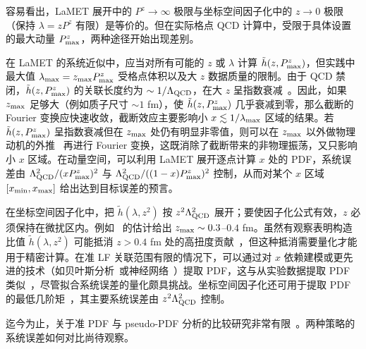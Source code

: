 容易看出，LaMET 展开中的 $P^z\to\infty$ 极限与坐标空间因子化中的 $z\to 0$ 极限（保持 $\lambda=zP^z$ 有限）是等价的。但在实际格点 QCD 计算中，受限于具体设置的最大动量 $P^z_{\rm max}$，两种途径开始出现差别。

在 LaMET 的系统近似中，应当对所有可能的 $z$ 或 $\lambda$ 计算 $\tilde h (z, P^z_{\rm max})$，但实践中最大值 $\lambda_{\rm max} = z_{\rm max}P^z_{\rm max}$ 受格点体积以及大 $z$ 数据质量的限制。由于 QCD 禁闭，$\tilde h (z, P^z_{\rm max})$ 的关联长度约为 $\sim 1/\Lambda_{\rm QCD}$，在大 $z$ 呈指数衰减~\cite{Ji:2020brr}。因此，如果 $z_{\rm max}$ 足够大（例如质子尺寸 $\sim1$ fm），使 $\tilde h (z, P^z_{\rm max})$ 几乎衰减到零，那么截断的 Fourier 变换应快速收敛，截断效应主要影响小 $x \lesssim 1/\lambda_{\rm max}$ 区域的结果。若 $\tilde h (z, P^z_{\rm max})$ 呈指数衰减但在 $z_{\rm max}$ 处仍有明显非零值，则可以在 $z_{\rm max}$ 以外做物理动机的外推~\cite{Ji:2020brr} 再进行 Fourier 变换，这既消除了截断带来的非物理振荡，又只影响小 $x$ 区域。在动量空间，可以利用 LaMET 展开逐点计算 $x$ 处的 PDF，系统误差由 $\Lambda_{\rm QCD}^2/(xP^z_{\rm max})^2$ 与 $\Lambda_{\rm QCD}^2/((1-x)P^z_{\rm max})^2$ 控制，从而对某个 $x$ 区域 $[x_{\rm min}, x_{\rm max}]$ 给出达到目标误差的预言。

在坐标空间因子化中，把 $\tilde h(\lambda, z^2)$ 按 $z^2\Lambda^2_{\rm QCD}$ 展开；要使因子化公式有效，$z$ 必须保持在微扰区内。例如~\cite{Ji:2020brr} 的估计给出 $z_{\rm max}\sim 0.3$--$0.4$ fm。虽然有观察表明构造比值 $\tilde h (\lambda, z^2)$ 可能抵消 $z>0.4$ fm 处的高扭度贡献~\cite{Orginos:2017kos}，但这种抵消需要量化才能用于精密计算。在准 LF 关联范围有限的情况下，可以通过对 $x$ 依赖建模或更先进的技术（如贝叶斯分析~\cite{Bringewatt:2020ixn}或神经网络~\cite{Karpie:2019eiq,Cichy:2019ebf,DelDebbio:2020rgv}）提取 PDF，这与从实验数据提取 PDF 类似~\cite{Ma:2017pxb}，尽管拟合系统误差的量化颇具挑战。坐标空间因子化还可用于提取 PDF 的最低几阶矩~\cite{Karpie:2018zaz,Shugert:2020tgq,Joo:2020spy,Gao:2020ito}，其主要系统误差由 $z^2\Lambda_{\rm QCD}^2$ 控制。

迄今为止，关于准 PDF 与 pseudo-PDF 分析的比较研究非常有限~\cite{Bhat:2020ktg,Alexandrou:2020qtt}。两种策略的系统误差如何对比尚待观察。

